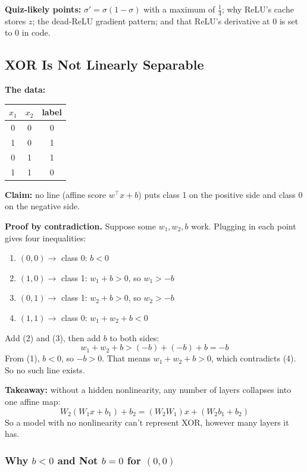 \textbf{Quiz-likely points:} $\sigma' = \sigma(1-\sigma)$ with a maximum of $\frac{1}{4}$; why ReLU's cache stores $z$; the dead-ReLU gradient pattern; and that ReLU's derivative at 0 is set to 0 in code.


\subsection*{XOR Is Not Linearly Separable}

\textbf{The data:}
\begin{center}
\begin{tabular}{ccc}
\toprule
$x_1$ & $x_2$ & label \\
\midrule
0 & 0 & 0 \\
1 & 0 & 1 \\
0 & 1 & 1 \\
1 & 1 & 0 \\
\bottomrule
\end{tabular}
\end{center}

\textbf{Claim:} no line (affine score $w^\top x + b$) puts class 1 on the positive side and class 0 on the negative side.

\textbf{Proof by contradiction.} Suppose some $w_1, w_2, b$ work. Plugging in each point gives four inequalities:
\begin{enumerate}
  \item $(0,0) \to$ class 0: $b < 0$
  \item $(1,0) \to$ class 1: $w_1 + b > 0$, so $w_1 > -b$
  \item $(0,1) \to$ class 1: $w_2 + b > 0$, so $w_2 > -b$
  \item $(1,1) \to$ class 0: $w_1 + w_2 + b < 0$
\end{enumerate}

Add (2) and (3), then add $b$ to both sides:
\[
w_1 + w_2 + b > (-b) + (-b) + b = -b
\]
From (1), $b < 0$, so $-b > 0$. That means $w_1 + w_2 + b > 0$, which contradicts (4). So no such line exists.

\textbf{Takeaway:} without a hidden nonlinearity, any number of layers collapses into one affine map:
\[
W_2(W_1 x + b_1) + b_2 = (W_2 W_1)x + (W_2 b_1 + b_2)
\]
So a model with no nonlinearity can't represent XOR, however many layers it has.

\subsubsection*{Why $b < 0$ and Not $b = 0$ for $(0,0)$}


